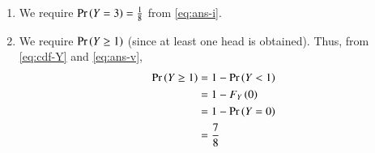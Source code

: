 \documentclass[journal,12pt,twocolumn]{IEEEtran}
\begin{document}
\begin{enumerate}
\begin{enumerate}
        \item We require $\Pr\left(Y=3\right) = \frac{1}{8}$ from \eqref{eq:ans-i}.

        \item We require $\Pr\left(Y\ge1\right)$ (since at least one head is obtained). Thus, from 
        \eqref{eq:cdf-Y} and \eqref{eq:ans-v},
            \begin{align}
                \Pr\left(Y\ge1\right) &= 1 - \Pr\left(Y<1\right) \\
                           &= 1 - F_Y\left(0\right) \\
                           &= 1 - \Pr\left(Y=0\right) \\
                           &= \frac{7}{8}
            \end{align}
    \end{enumerate}
\end{enumerate}
\end{document}
